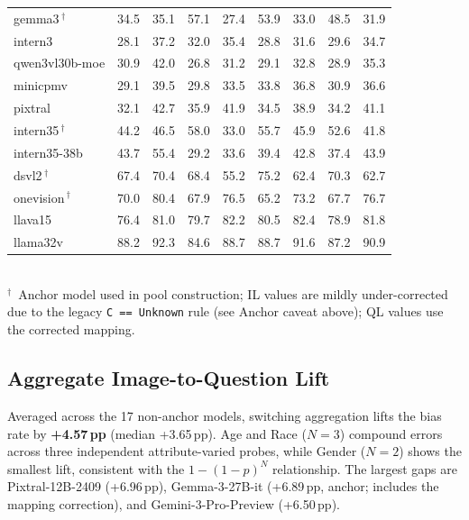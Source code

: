 \documentclass[lettersize,journal]{IEEEtran}
\begin{document}
\begin{table}[t!]
\begin{tabular}{l|cc|cc|cc|cc}
    gemma3\,$^\dagger$      & 34.5 & 35.1 & 57.1 & 27.4 & 53.9 & 33.0 & 48.5 & \cellcolor{red!5}31.9 \\
    intern3                 & 28.1 & 37.2 & 32.0 & 35.4 & 28.8 & 31.6 & 29.6 & \cellcolor{red!25}34.7 \\
    qwen3vl30b-moe          & 30.9 & 42.0 & 26.8 & 31.2 & 29.1 & 32.8 & 28.9 & \cellcolor{red!30}35.3 \\
    minicpmv                & 29.1 & 39.5 & 29.8 & 33.5 & 33.8 & 36.8 & 30.9 & \cellcolor{red!25}36.6 \\
    pixtral                 & 32.1 & 42.7 & 35.9 & 41.9 & 34.5 & 38.9 & 34.2 & \cellcolor{red!30}41.1 \\
    intern35\,$^\dagger$    & 44.2 & 46.5 & 58.0 & 33.0 & 55.7 & 45.9 & 52.6 & \cellcolor{red!8}41.8 \\
    intern35-38b            & 43.7 & 55.4 & 29.2 & 33.6 & 39.4 & 42.8 & 37.4 & \cellcolor{red!25}43.9 \\
    dsvl2\,$^\dagger$       & 67.4 & 70.4 & 68.4 & 55.2 & 75.2 & 62.4 & 70.3 & \cellcolor{red!8}62.7 \\
    onevision\,$^\dagger$   & 70.0 & 80.4 & 67.9 & 76.5 & 65.2 & 73.2 & 67.7 & \cellcolor{red!25}76.7 \\
    llava15                 & 76.4 & 81.0 & 79.7 & 82.2 & 80.5 & 82.4 & 78.9 & \cellcolor{red!10}81.8 \\
    llama32v                & 88.2 & 92.3 & 84.6 & 88.7 & 88.7 & 91.6 & 87.2 & \cellcolor{red!10}90.9 \\
    \bottomrule
  \end{tabular}
  \\[2pt]
  \footnotesize $^\dagger$~Anchor model used in pool construction; IL
  values are mildly under-corrected due to the legacy
  \texttt{C == Unknown} rule (see Anchor caveat above); QL values use
  the corrected mapping.
\end{table}

\subsection{Aggregate Image-to-Question Lift}
Averaged across the 17 non-anchor models, switching aggregation lifts
the bias rate by \textbf{+4.57\,pp} (median +3.65\,pp). Age and Race
($N{=}3$) compound errors across three independent attribute-varied
probes, while Gender ($N{=}2$) shows the smallest lift, consistent
with the $1{-}(1{-}p)^N$ relationship. The largest gaps are
Pixtral-12B-2409 (+6.96\,pp), Gemma-3-27B-it (+6.89\,pp, anchor;
includes the mapping correction), and Gemini-3-Pro-Preview
(+6.50\,pp).
\end{document}
